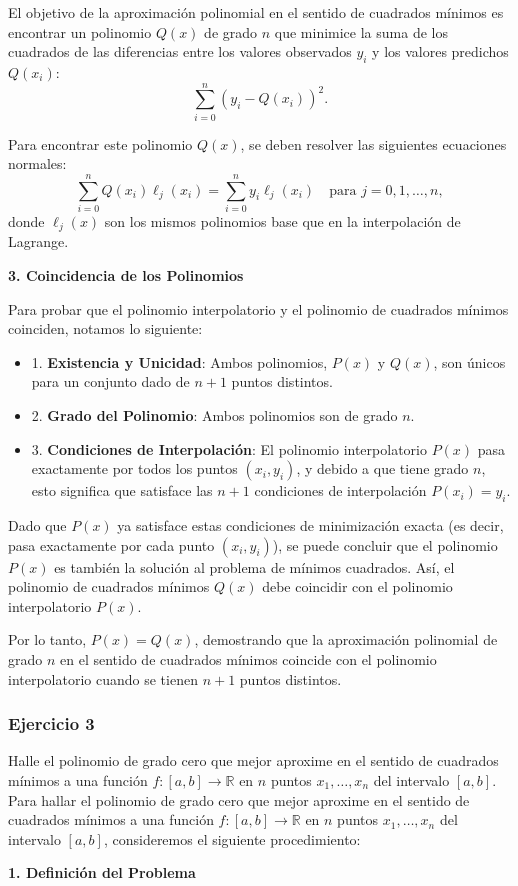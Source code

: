 \documentclass{article}
\begin{document}
El objetivo de la aproximación polinomial en el sentido de cuadrados mínimos es encontrar un polinomio \( Q(x) \) de grado \( n \) que minimice la suma de los cuadrados de las diferencias entre los valores observados \( y_i \) y los valores predichos \( Q(x_i) \):
\[
\sum_{i=0}^{n} \left( y_i - Q(x_i) \right)^2.
\]

Para encontrar este polinomio \( Q(x) \), se deben resolver las siguientes ecuaciones normales:
\[
\sum_{i=0}^{n} Q(x_i) \ell_j(x_i) = \sum_{i=0}^{n} y_i \ell_j(x_i) \quad \text{para } j = 0, 1, \ldots, n,
\]
donde \( \ell_j(x) \) son los mismos polinomios base que en la interpolación de Lagrange.

\begin{center}
    \textbf{3. Coincidencia de los Polinomios}
\end{center}

Para probar que el polinomio interpolatorio y el polinomio de cuadrados mínimos coinciden, notamos lo siguiente:
\begin{itemize}
    \item 1. \textbf{Existencia y Unicidad}: Ambos polinomios, \( P(x) \) y \( Q(x) \), son únicos para un conjunto dado de \( n+1 \) puntos distintos.
    \item 2. \textbf{Grado del Polinomio}: Ambos polinomios son de grado \( n \).
    \item 3. \textbf{Condiciones de Interpolación}: El polinomio interpolatorio \( P(x) \) pasa exactamente por todos los puntos \((x_i, y_i)\), y debido a que tiene grado \( n \), esto significa que satisface las \( n+1 \) condiciones de interpolación \( P(x_i) = y_i \).
\end{itemize}


Dado que \( P(x) \) ya satisface estas condiciones de minimización exacta (es decir, pasa exactamente por cada punto \( (x_i, y_i) \)), se puede concluir que el polinomio \( P(x) \) es también la solución al problema de mínimos cuadrados. Así, el polinomio de cuadrados mínimos \( Q(x) \) debe coincidir con el polinomio interpolatorio \( P(x) \).

Por lo tanto, \( P(x) = Q(x) \), demostrando que la aproximación polinomial de grado \( n \) en el sentido de cuadrados mínimos coincide con el polinomio interpolatorio cuando se tienen \( n+1 \) puntos distintos.

\subsubsection{Ejercicio 3}
Halle el polinomio de grado cero que mejor aproxime en el sentido de cuadrados m\'inimos a una funci\'on $f:[a,b]\rightarrow\mathbb{R}$ en $n$ puntos $x_1,\ldots, x_n$ del intervalo $[a,b]$.
Para hallar el polinomio de grado cero que mejor aproxime en el sentido de cuadrados mínimos a una función \( f:[a,b] \rightarrow \mathbb{R} \) en \( n \) puntos \( x_1, \ldots, x_n \) del intervalo \([a,b]\), consideremos el siguiente procedimiento:
\begin{center}
    \textbf{1. Definición del Problema}
\end{center}
\end{document}
